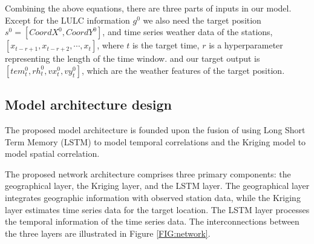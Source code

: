 \documentclass[a4paper,fleqn]{cas-sc}
\begin{document}

Combining the above equations, there are three parts of inputs in our model. Except for the LULC information $g^0$  we also need the target position $s^0=[CoordX^0,CoordY^0]$, and time series weather data of the stations, $[x_{t-r+1},x_{t-r+2},\cdots,x_{t}]$, where $t$ is the target time, $r$ is a hyperparameter representing the length of the time window. and our target output is $[tem^0_t,rh^0_t,vx^0_t,vy^0_t]$, which are the weather features of the target position.

\subsection{Model architecture design}\label{model_design}

The proposed model architecture is founded upon the fusion of using Long Short Term Memory (LSTM) to model temporal correlations and the Kriging model to model spatial correlation. 

The proposed network architecture comprises three primary components: the geographical layer, the Kriging layer, and the LSTM layer. The geographical layer integrates geographic information with observed station data, while the Kriging layer estimates time series data for the target location. The LSTM layer processes the temporal information of the time series data. The interconnections between the three layers are illustrated in Figure \ref{FIG:network}. 
\end{document}
